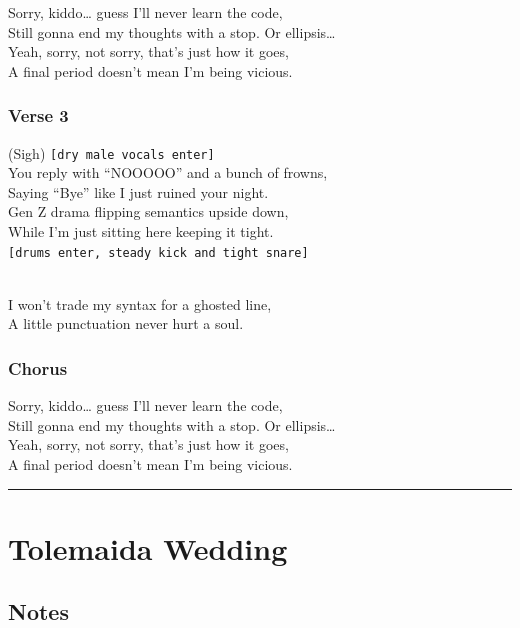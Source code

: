 Sorry, kiddo\ldots{} guess I'll never learn the code,\\
Still gonna end my thoughts with a stop. Or ellipsis\ldots{}\\
Yeah, sorry, not sorry, that's just how it goes,\\
A final period doesn't mean I'm being vicious.

\subsubsection{Verse 3}\label{verse-3-5}

(Sigh) \texttt{{[}dry\ male\ vocals\ enter{]}}\\
You reply with ``NOOOOO'' and a bunch of frowns,\\
Saying ``Bye'' like I just ruined your night.\\
Gen Z drama flipping semantics upside down,\\
While I'm just sitting here keeping it tight.\\
\texttt{{[}drums\ enter,\ steady\ kick\ and\ tight\ snare{]}}\strut \\
I won't trade my syntax for a ghosted line,\\
A little punctuation never hurt a soul.

\subsubsection{Chorus}\label{chorus-25}

Sorry, kiddo\ldots{} guess I'll never learn the code,\\
Still gonna end my thoughts with a stop. Or ellipsis\ldots{}\\
Yeah, sorry, not sorry, that's just how it goes,\\
A final period doesn't mean I'm being vicious.

\begin{center}\rule{0.5\linewidth}{0.5pt}\end{center}

\section{Tolemaida Wedding}\label{tolemaida-wedding}

\subsection{Notes}\label{notes-13}

